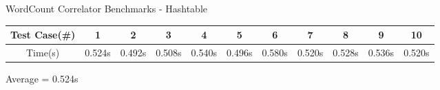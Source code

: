 \documentclass[12pt, oneside, letter]{article}
\newcommand{\env}[2]{
    \begin{#1}
        #2
    \end{#1}
}
\begin{document}
    \env{center} {
        WordCount Correlator Benchmarks - Hashtable

        \vspace*{0.1in}

        \begin{tabular}{|c|c|c|c|c|c|c|c|c|c|c|}
            \hline
            Test Case(\#) & 1      & 2      & 3      & 4      & 5      & 6      & 7      & 8      & 9      & 10 \\
            \hline
            Time(s)       & 0.524s & 0.492s & 0.508s & 0.540s & 0.496s & 0.580s & 0.520s & 0.528s & 0.536s & 0.520s\\
            \hline
        \end{tabular}

        \vspace*{0.1in}

        Average = 0.524s
    }
\end{document}
